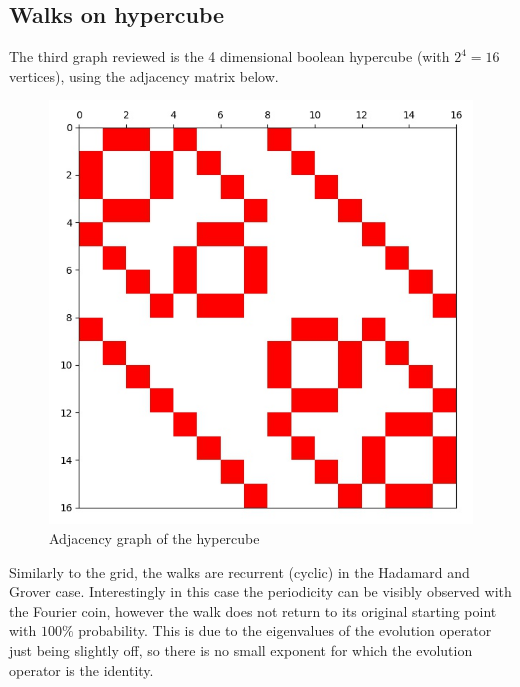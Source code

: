 \subsection{Walks on hypercube}

The third graph reviewed is the 4 dimensional boolean hypercube (with $2^4 = 16$ vertices), using the adjacency matrix below.

\begin{figure}[H]
\centering
\includegraphics[width=0.5\linewidth]{./figures/results/hypercube/graph.jpg}
\caption{Adjacency graph of the hypercube}
\end{figure}

Similarly to the grid, the walks are recurrent (cyclic) in the Hadamard and Grover case. Interestingly in this case the periodicity can be visibly observed with the Fourier coin, however the walk does not return to its
original starting point with $100\%$ probability. This is due to the eigenvalues of the evolution operator
just being slightly off, so there is no small exponent for which the evolution operator is the identity.

